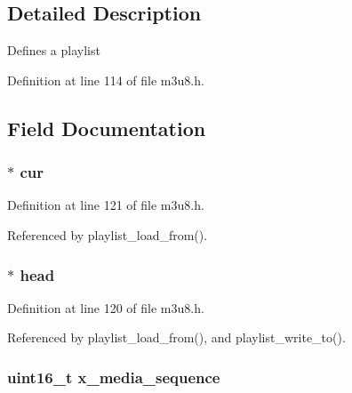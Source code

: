 \subsection{\-Detailed \-Description}
\-Defines a playlist 

\-Definition at line 114 of file m3u8.\-h.



\subsection{\-Field \-Documentation}
\hypertarget{struct_playlist_a0d3665b271a9105ad516c49c5572c77b}{
\subsubsection[{cur}]{$\ast$ {\bf cur}}}\label{struct_playlist_a0d3665b271a9105ad516c49c5572c77b}


\-Definition at line 121 of file m3u8.\-h.



\-Referenced by playlist\-\_\-load\-\_\-from().

\hypertarget{struct_playlist_adbbc6e0a2881880caf79e9b2d0ee9d09}{
\subsubsection[{head}]{$\ast$ {\bf head}}}\label{struct_playlist_adbbc6e0a2881880caf79e9b2d0ee9d09}


\-Definition at line 120 of file m3u8.\-h.



\-Referenced by playlist\-\_\-load\-\_\-from(), and playlist\-\_\-write\-\_\-to().

\hypertarget{struct_playlist_a5777a3f8846ff7f63461d4a0bad7ad09}{
\subsubsection[{x\-\_\-media\-\_\-sequence}]{\setlength{\rightskip}{0pt plus 5cm}uint16\-\_\-t {\bf x\-\_\-media\-\_\-sequence}}}\label{struct_playlist_a5777a3f8846ff7f63461d4a0bad7ad09}


